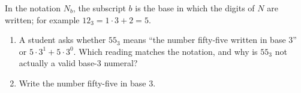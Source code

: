 In the notation $N_b$, the subscript $b$ is the base in which the digits of $N$ are written; for example $12_3=1\cdot3+2=5$.
\begin{enumerate}
\item[(a)] A student asks whether $55_3$ means ``the number fifty-five written in base $3$'' or $5\cdot3^1+5\cdot3^0$. Which reading matches the notation, and why is $55_3$ not actually a valid base-$3$ numeral?
\item[(b)] Write the number fifty-five in base $3$.
\end{enumerate}
